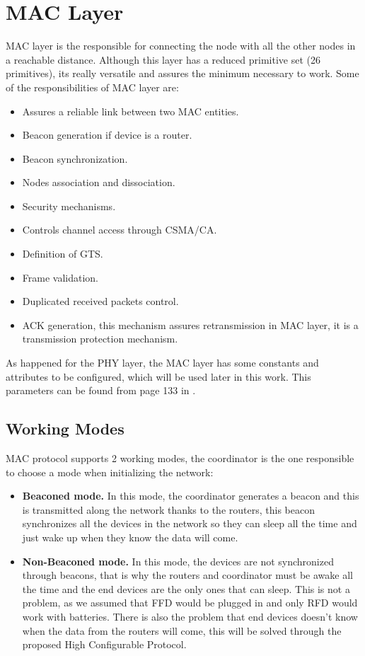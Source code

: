\section{\ac{MAC} Layer}

\ac{MAC} layer is the responsible for connecting the node with all the other nodes in a reachable distance. Although this layer has a reduced
primitive set (26 primitives), its really versatile and assures the minimum necessary to work. Some of the responsibilities of \ac{MAC}
layer are:

\begin{itemize}
 \item Assures a reliable link between two \ac{MAC} entities.
 \item Beacon generation if device is a router.
 \item Beacon synchronization.
 \item Nodes association and dissociation.
 \item Security mechanisms.
 \item Controls channel access through \ac{CSMA/CA}.
 \item Definition of \ac{GTS}.
 \item Frame validation.
 \item Duplicated received packets control.
 \item \ac{ACK} generation, this mechanism assures retransmission in \ac{MAC} layer, it is a transmission protection mechanism.
\end{itemize}

As happened for the \ac{PHY} layer, the \ac{MAC} layer has some constants and attributes to be configured, which will be used later in this work.
This parameters can be found from page 133 in \cite{IEEE802.15.4-2006}.

\subsection{Working Modes}

\ac{MAC} protocol supports 2 working modes, the coordinator is the one responsible to choose a mode when initializing the network:

\begin{itemize}
 \item \textbf{Beaconed mode.} In this mode, the coordinator generates a beacon and this is transmitted along the network thanks to the routers,
this beacon synchronizes all the devices in the network so they can sleep all the time and just wake up when they know the data will come. 
 \item \textbf{Non-Beaconed mode.} In this mode, the devices are not synchronized through beacons, that is why the routers and coordinator must
be awake all the time and the end devices are the only ones that can sleep. This is not a problem, as we assumed that \ac{FFD} would be plugged 
in and only \ac{RFD} would work with batteries. There is also the problem that end devices doesn't know when the data from the routers will come,
this will be solved through the proposed High Configurable Protocol.
\end{itemize}

